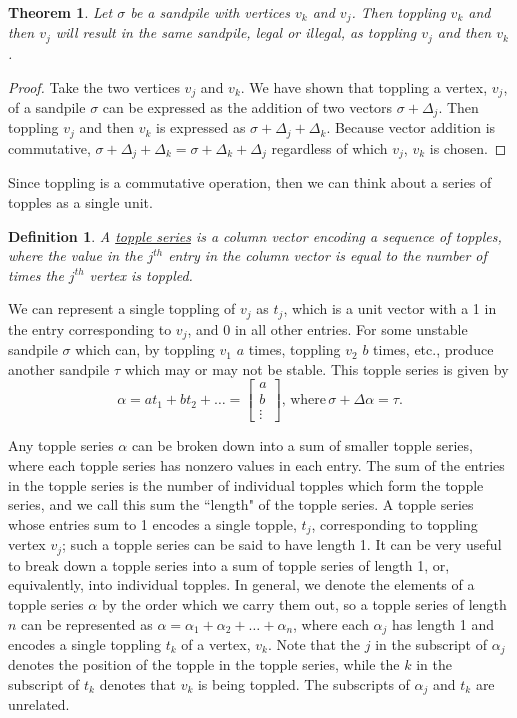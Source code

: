 \documentclass[12pt]{article}
\newtheorem{theorem}{Theorem}
\newtheorem{definition}{Definition}
\begin{document}
\begin{theorem}
    Let $\sigma$ be a sandpile with vertices $v_k$ and $v_j$. Then toppling $v_k$ and then $v_j$ will result in the same sandpile, legal or illegal, as toppling $v_j$ and then $v_k$.
    \label{th:commutative}
\end{theorem}
\begin{proof}
Take the two vertices $v_j$ and $v_k$.  We have shown that toppling a vertex, $v_j$, of a sandpile $\sigma$ can be expressed as the addition of two vectors $\sigma + \Delta_j$.  Then toppling $v_j$ and then $v_k$ is expressed as $\sigma + \Delta_j + \Delta_k$.  Because vector addition is commutative, $\sigma + \Delta_j + \Delta_k=\sigma + \Delta_k + \Delta_j$ regardless of which $v_j$, $v_k$ is chosen. 
\end{proof}

Since toppling is a commutative operation, then we can think about a series of topples as a single unit.

\begin{definition}
    A \underline{topple series} is a column vector encoding a sequence of topples, where the value in the $j^{th}$ entry in the column vector is equal to the number of times the $j^{th}$ vertex is toppled.
\end{definition}

We can represent a single toppling of $v_j$ as $t_j$, which is a unit vector with a 1 in the entry corresponding to $v_j$, and 0 in all other entries.  For some unstable sandpile $\sigma$ which can, by toppling $v_1$ $a$ times, toppling $v_2$ $b$ times, etc., produce another sandpile $\tau$ which may or may not be stable.  This topple series is given by $$\alpha = a t_1 + b t_2 + \ldots = \begin{bmatrix} a \\ b \\ \vdots \end{bmatrix}, \, \text{where} \, \sigma + \Delta \alpha = \tau.$$

Any topple series $\alpha$ can be broken down into a sum of smaller topple series, where each topple series has nonzero values in each entry.  The sum of the entries in the topple series is the number of individual topples which form the topple series, and we call this sum the ``length" of the topple series.  A topple series whose entries sum to 1 encodes a single topple, $t_j$, corresponding to toppling vertex $v_j$; such a topple series can be said to have length 1.  It can be very useful to break down a topple series into a sum of topple series of length 1, or, equivalently, into individual topples.  In general, we denote the elements of a topple series $\alpha$ by the order which we carry them out, so a topple series of length $n$ can be represented as $\alpha = \alpha_1 + \alpha_2 + \ldots + \alpha_n$, where each $\alpha_j$ has length 1 and encodes a single toppling $t_k$ of a vertex, $v_k$.  Note that the $j$ in the subscript of $\alpha_j$ denotes the position of the topple in the topple series, while the $k$ in the subscript of $t_k$ denotes that $v_k$ is being toppled.  The subscripts of $\alpha_j$ and $t_k$ are unrelated.
\end{document}
